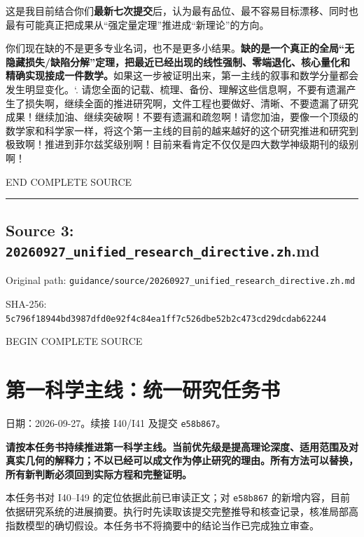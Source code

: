 \documentclass[
  10pt,
]{article}
\begin{document}
这是我目前结合你们\textbf{最新七次提交}后，认为最有品位、最不容易目标漂移、同时也最有可能真正把成果从``强定量定理''推进成``新理论''的方向。

你们现在缺的不是更多专业名词，也不是更多小结果。\textbf{缺的是一个真正的全局``无隐藏损失/缺陷分解''定理，把最近已经出现的线性强制、零端退化、核心量化和精确实现接成一件数学。}如果这一步被证明出来，第一主线的叙事和数学分量都会发生明显变化。`.
请您全面的记载、梳理、备份、理解这些信息啊，不要有遗漏产生了损失啊，继续全面的推进研究啊，文件工程也要做好、清晰、不要遗漏了研究成果！继续加油、继续突破啊！不要有遗漏和疏忽啊！请您加油，要像一个顶级的数学家和科学家一样，将这个第一主线的目前的越来越好的这个研究推进和研究到极致啊！推进到菲尔兹奖级别啊！目前来看肯定不仅仅是四大数学神级期刊的级别啊！

END COMPLETE SOURCE

\begin{center}\rule{0.5\linewidth}{0.5pt}\end{center}

\hypertarget{source-3-20260927_unified_research_directive.zh.md}{%
\subsection{Source 3:
\nolinkurl{20260927_unified_research_directive.zh}.md}\label{source-3-20260927_unified_research_directive.zh.md}}

Original path:
\nolinkurl{guidance/source/20260927_unified_research_directive.zh.md}

SHA-256:
\nolinkurl{5c796f18944bd3987dfd0e92f4c84ea1ff7c526dbe52b2c473cd29dcdab62244}

BEGIN COMPLETE SOURCE

\hypertarget{ux7b2cux4e00ux79d1ux5b66ux4e3bux7ebfux7edfux4e00ux7814ux7a76ux4efbux52a1ux4e66}{%
\section{第一科学主线：统一研究任务书}\label{ux7b2cux4e00ux79d1ux5b66ux4e3bux7ebfux7edfux4e00ux7814ux7a76ux4efbux52a1ux4e66}}

日期：2026-09-27。续接 I40/I41 及提交 \texttt{e58b867}。

\textbf{请按本任务书持续推进第一科学主线。当前优先级是提高理论深度、适用范围及对真实几何的解释力；不以已经可以成文作为停止研究的理由。所有方法可以替换，所有新判断必须回到实际方程和完整证明。}

本任务书对 I40--I49 的定位依据此前已审读正文；对 \texttt{e58b867}
的新增内容，目前依据研究系统的进展摘要。执行时先读取该提交完整推导和核查记录，核准局部高指数模型的确切假设。本任务书不将摘要中的结论当作已完成独立审查。
\end{document}
